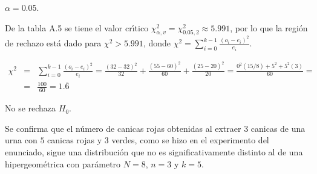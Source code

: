 \begin{solucion}
 \begin{significancia}
  $\alpha = 0.05$.
 \end{significancia}

 \begin{region}
  De la tabla A.5 se tiene el valor cr\'{\i}tico
  $\chi^2_{\alpha,v} = \chi^2_{0.05,2} \approx 5.991$,
  por lo que la regi\'on de rechazo est\'a dado
  para $\chi^2 > 5.991$, donde
  $\chi^2 = \sum_{i=0}^{k-1} \frac{\left( o_i - e_i \right)^2}{e_i}$.
 \end{region}

 \begin{estadistico}
  \begin{eqnarray*}
   \chi^2 & = & \sum_{i=0}^{k-1} \frac{\left( o_i - e_i \right)^2}{e_i}
   = \frac{(32-32)^2}{32} + \frac{(55-60)^2}{60} + \frac{(25-20)^2}{20}
   = \frac{0^2(15/8) + 5^2 + 5^2(3)}{60} = \\
   & = & \frac{100}{60} = 1.\overline{6}
  \end{eqnarray*}
 \end{estadistico}

 \begin{decision}
  No se rechaza $H_0$.
 \end{decision}

 \begin{conclusion}
  Se confirma que el n\'umero de canicas rojas obtenidas al extraer $3$
  canicas de una urna con $5$ canicas rojas y $3$ verdes,
  como se hizo en el experimento del enunciado,
  sigue una distribuci\'on que no es significativamente distinto
  al de una hipergeom\'etrica con par\'ametro $N = 8$, $n=3$ y $k=5$.
 \end{conclusion}
 

\end{solucion}
